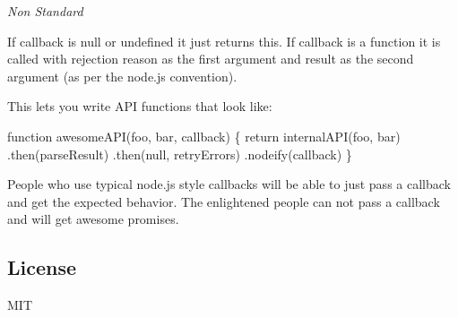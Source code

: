 {\itshape Non Standard}

If {\ttfamily callback} is {\ttfamily null} or {\ttfamily undefined} it just returns {\ttfamily this}. If {\ttfamily callback} is a function it is called with rejection reason as the first argument and result as the second argument (as per the node.\+js convention).

This lets you write A\+PI functions that look like\+:


\begin{DoxyCode}
function awesomeAPI(foo, bar, callback) \{
  return internalAPI(foo, bar)
    .then(parseResult)
    .then(null, retryErrors)
    .nodeify(callback)
\}
\end{DoxyCode}


People who use typical node.\+js style callbacks will be able to just pass a callback and get the expected behavior. The enlightened people can not pass a callback and will get awesome promises.

\subsection*{License}

M\+IT 